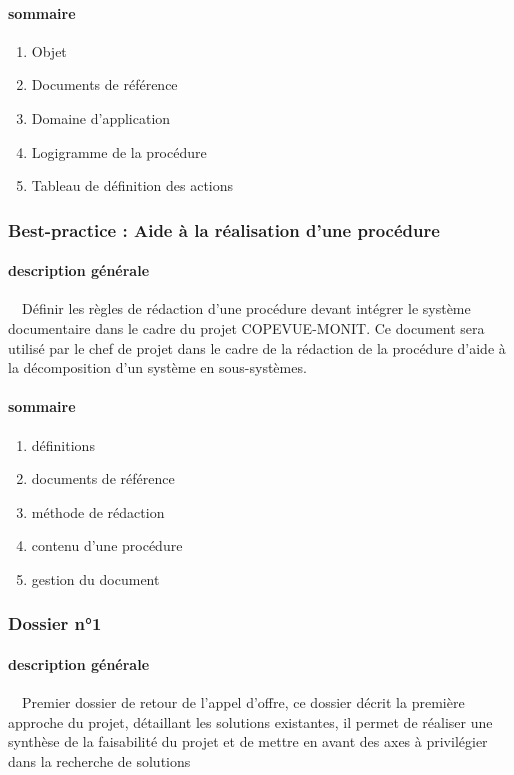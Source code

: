 \documentclass{article}
\begin{document}
\paragraph[sommaire]{sommaire}
\begin{enumerate}
\item Objet
\item Documents de référence
\item Domaine d’application
\item Logigramme de la procédure
\item Tableau de définition des actions
\end{enumerate}
\subsubsection[Best{}-practice : Aide à la réalisation d’une
procédure]{Best-practice : Aide à la réalisation d’une procédure}
\paragraph[description générale]{description générale}
\ \ Définir les règles de rédaction d’une procédure devant intégrer le
système documentaire dans le cadre du projet COPEVUE-MONIT. Ce document
sera utilisé par le chef de projet dans le cadre de la rédaction de la
procédure d’aide à la décomposition d’un système en sous-systèmes.

\paragraph[sommaire]{sommaire}
\begin{enumerate}
\item définitions
\item documents de référence
\item méthode de rédaction
\item contenu d’une procédure
\item gestion du document
\end{enumerate}
\subsubsection[Dossier n°1]{Dossier n°1}
\paragraph[description générale]{description générale}
\ \ Premier dossier de retour de l’appel d’offre, ce dossier décrit la
première approche du projet, détaillant les solutions existantes, il
permet de réaliser une synthèse de la faisabilité du projet et de
mettre en avant des axes à privilégier dans la recherche de solutions
\end{document}
